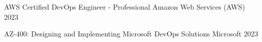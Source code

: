 
\begin{cvhonors}

  \cvhonor
    {AWS Certified DevOps Engineer - Professional} %
    {Amazon Web Services (AWS)} %
    {} %
    {2023} %

  \cvhonor
    {AZ-400: Designing and Implementing Microsoft DevOps Solutions} %
    {Microsoft} %
    {} %
    {2023} %


\end{cvhonors}







